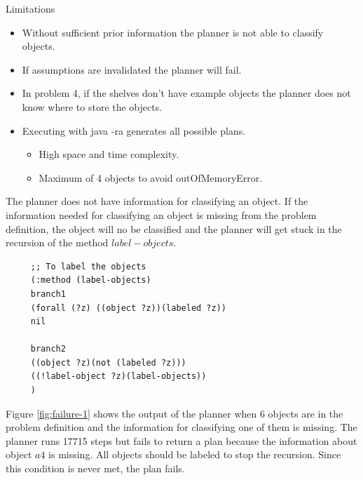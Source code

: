 \documentclass{beamer}
\begin{document}
	
	\begin{frame}{Limitations}
		\begin{itemize}
			\item Without sufficient prior information the planner is not able to classify objects.
			\item If assumptions are invalidated the planner will fail.
			\item In problem 4, if the shelves don't have example objects the planner does not know where to store the objects.
			\item Executing with java -ra generates all possible plans.
			\begin{itemize}
				\item High space and time complexity.
				\item Maximum of 4 objects to avoid outOfMemoryError.
			\end{itemize}
		\end{itemize}
	\end{frame}
	
	\begin{frame}{The planner does not have information for classifying an object.}
			If the information needed for classifying an object is missing from the problem definition, the object will no be classified and the planner will get stuck in the recursion of the method $label-objects$. 
			
	\end{frame}
			
		\begin{lstlisting}
	 ;; To label the objects
	 (:method (label-objects)
	 branch1
	 (forall (?z) ((object ?z))(labeled ?z))
	 nil
	 
	 branch2
	 ((object ?z)(not (labeled ?z)))
	 ((!label-object ?z)(label-objects))
	 )
		\end{lstlisting}
		
		Figure \ref{fig:failure-1} shows the output of the planner when 6 objects are in the problem definition and the information for classifying one of them is missing. The planner runs 17715 steps but fails to return a plan because the information about object $a4$ is missing. All objects should be labeled to stop the recursion. Since this condition is never met, the plan fails. \\
		
\end{document}
